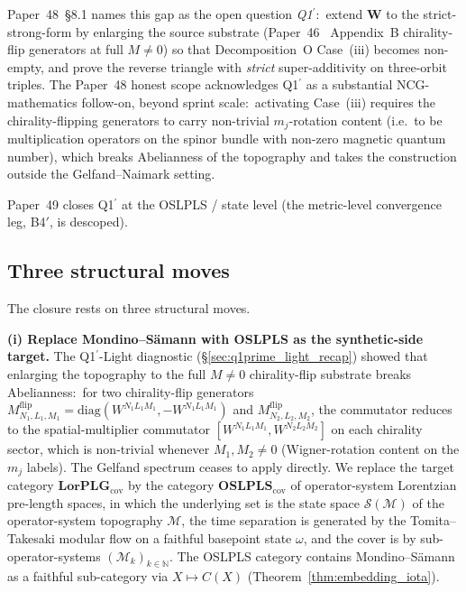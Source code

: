 \documentclass[11pt,a4paper]{article}
\theoremstyle{plain}
\theoremstyle{definition}
\newcommand{\Scal}{\mathcal{S}}
\newcommand{\Mcal}{\mathcal{M}}
\newcommand{\N}{\mathbb{N}}
\newcommand{\Wfun}{\mathbf{W}}
\newcommand{\LorPLG}{\mathbf{LorPLG}_{\mathrm{cov}}}
\newcommand{\OSLPLS}{\mathbf{OSLPLS}_{\mathrm{cov}}}
\newcommand{\Mflip}[3]{M^{\mathrm{flip}}_{#1,#2,#3}}
\newcommand{\Wspat}[3]{W^{#1#2#3}}
\begin{document}
Paper~48~\S 8.1 names this gap as the open question \emph{Q1$^{\prime}$}:\
extend $\Wfun$ to the strict-strong-form by enlarging the source
substrate (Paper~46~\cite{paper46} Appendix~B chirality-flip
generators at full $M\ne 0$) so that Decomposition~O Case~(iii)
becomes non-empty, and prove the reverse triangle with \emph{strict}
super-additivity on three-orbit triples. The Paper~48 honest scope
acknowledges Q1$^{\prime}$ as a substantial NCG-mathematics
follow-on, beyond sprint scale:\ activating Case~(iii) requires the chirality-flipping
generators to carry non-trivial $m_{j}$-rotation content (i.e.\ to be
multiplication operators on the spinor bundle with non-zero magnetic
quantum number), which breaks Abelianness of the topography and
takes the construction outside the Gelfand--Naimark setting.

Paper~49 closes Q1$^{\prime}$ at the OSLPLS / state level (the
metric-level convergence leg, B4$'$, is descoped).

\subsection{Three structural moves}\label{sec:three_moves}

The closure rests on three structural moves.

\textbf{(i) Replace Mondino--S\"amann with OSLPLS as the synthetic-side
target.} The Q1$^{\prime}$-Light diagnostic
(\S\ref{sec:q1prime_light_recap}) showed that enlarging the topography
to the full $M\ne 0$ chirality-flip substrate breaks Abelianness:\ for
two chirality-flip generators
$\Mflip{N_{1}}{L_{1}}{M_{1}}=\mathrm{diag}(\Wspat{N_{1}}{L_{1}}{M_{1}},
-\Wspat{N_{1}}{L_{1}}{M_{1}})$ and $\Mflip{N_{2}}{L_{2}}{M_{2}}$, the
commutator reduces to the spatial-multiplier commutator
$[\Wspat{N_{1}}{L_{1}}{M_{1}},\Wspat{N_{2}}{L_{2}}{M_{2}}]$ on each
chirality sector, which is non-trivial whenever $M_{1},M_{2}\ne 0$
(Wigner-rotation content on the $m_{j}$ labels). The Gelfand spectrum
ceases to apply directly. We replace the target category $\LorPLG$ by
the category $\OSLPLS$ of operator-system Lorentzian pre-length
spaces, in which the underlying set is the state space $\Scal(\Mcal)$
of the operator-system topography $\Mcal$, the time separation is
generated by the Tomita--Takesaki modular flow on a faithful basepoint
state $\omega$, and the cover is by sub-operator-systems
$(\Mcal_{k})_{k\in\N}$. The OSLPLS category contains Mondino--S\"amann
as a faithful sub-category via $X\mapsto C(X)$
(Theorem~\ref{thm:embedding_iota}).
\end{document}
